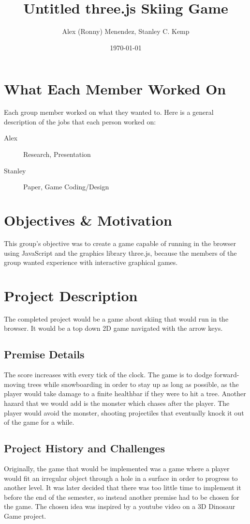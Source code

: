 \documentclass[11pt]{article}
\author{Alex (Ronny) Menendez, Stanley C. Kemp}
\date{\today}
\title{Untitled three.js Skiing Game}
\begin{document}
\maketitle
\section{What Each Member Worked On}
\label{sec:orgffad265}
Each group member worked on what they wanted to. Here is a general description of
the jobs that each person worked on:
\begin{description}
\item[{Alex}] Research, Presentation
\item[{Stanley}] Paper, Game Coding/Design
\end{description}
\section{Objectives \& Motivation}
\label{sec:org14e2cad}
This group's objective was to create a game capable of running in the browser
using JavaScript and the graphics library three.js, because the members of the
group wanted experience with interactive graphical games. 
\section{Project Description}
\label{sec:org960ff48}
The completed project would be a game about skiing that would run in the browser.
It would be a top down 2D game navigated with the arrow keys.
\subsection{Premise Details}
\label{sec:org07e8efc}
The score increases with every tick of the clock.
The game is to dodge forward-moving trees while snowboarding in order to
stay up as long as possible, as
the player would take damage to a finite healthbar if they were to hit a tree.
Another hazard that we would add is the monster which chases after the player.
The player would avoid the monster, shooting projectiles that eventually knock
it out of the game for a while.
\subsection{Project History and Challenges}
\label{sec:orgf726bd9}
Originally, the game that would be implemented
was a game where a player would fit an irregular object
through a hole in a surface in order to progress to another level. It was later
decided that there was too little time to implement it before the end of the
semester, so instead another premise had to be chosen for the game.
The chosen idea was inspired by a youtube video on a 3D Dinosaur Game project.
\end{document}
